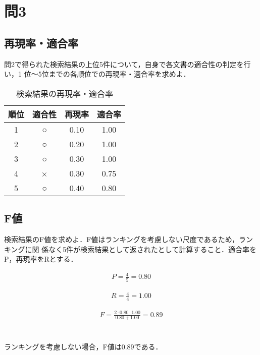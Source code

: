 \documentclass[dvipdfmx,autodetect-engine,titlepage]{jsarticle}
\begin{document}
\section{問3}
\subsection{再現率・適合率}
問2で得られた検索結果の上位5件について，自身で各文書の適合性の判定を行い，1 位〜5位までの各順位での再現率・適合率を求めよ．

\begin{table}[H]
  \centering
  \caption{検索結果の再現率・適合率}
  \label{table: Artifact}
  \begin{tabular}{|c|c|c|c|}
  \hline
  順位 & 適合性 & 再現率  & 適合率  \\ \hline
  1  & ○   & 0.10 & 1.00 \\
  2  & ○   & 0.20 & 1.00 \\
  3  & ○   & 0.30 & 1.00 \\
  4  & ×   & 0.30 & 0.75 \\
  5  & ○   & 0.40 & 0.80  \\ \hline
  \end{tabular}
  \end{table}

\subsection{F値}
検索結果のF値を求めよ．F値はランキングを考慮しない尺度であるため，ランキングに関
係なく5件が検索結果として返されたとして計算すること．適合率をP，再現率をRとする．

\begin{eqnarray*}
  P = \frac{4}{5} = 0.80
\end{eqnarray*}

\begin{eqnarray*}
  R = \frac{4}{4} = 1.00
\end{eqnarray*}

\begin{eqnarray*}
  F = \frac{2\cdot 0.80 \cdot 1.00}{0.80 + 1.00} 
  = 0.89
\end{eqnarray*}
　\\\\
ランキングを考慮しない場合，F値は0.89である．
\end{document}
